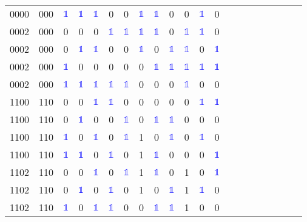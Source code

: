 \begin{longtable*}{c| cccccccccccccccccccc }
0000& 000& \textcolor{blue}{$\mathds{1}$}& \textcolor{blue}{$\mathds{1}$}& \textcolor{blue}{$\mathds{1}$}& 0& 0& \textcolor{blue}{$\mathds{1}$}& \textcolor{blue}{$\mathds{1}$}& 0& 0& \textcolor{blue}{$\mathds{1}$}& 0\\
0002& 000& 0& 0& 0& \textcolor{blue}{$\mathds{1}$}& \textcolor{blue}{$\mathds{1}$}& \textcolor{blue}{$\mathds{1}$}& \textcolor{blue}{$\mathds{1}$}& 0& \textcolor{blue}{$\mathds{1}$}& \textcolor{blue}{$\mathds{1}$}& 0\\
0002& 000& 0& \textcolor{blue}{$\mathds{1}$}& \textcolor{blue}{$\mathds{1}$}& 0& 0& \textcolor{blue}{$\mathds{1}$}& 0& \textcolor{blue}{$\mathds{1}$}& \textcolor{blue}{$\mathds{1}$}& 0& \textcolor{blue}{$\mathds{1}$}\\
0002& 000& \textcolor{blue}{$\mathds{1}$}& 0& 0& 0& 0& 0& \textcolor{blue}{$\mathds{1}$}& \textcolor{blue}{$\mathds{1}$}& \textcolor{blue}{$\mathds{1}$}& \textcolor{blue}{$\mathds{1}$}& \textcolor{blue}{$\mathds{1}$}\\
0002& 000& \textcolor{blue}{$\mathds{1}$}& \textcolor{blue}{$\mathds{1}$}& \textcolor{blue}{$\mathds{1}$}& \textcolor{blue}{$\mathds{1}$}& \textcolor{blue}{$\mathds{1}$}& 0& 0& 0& \textcolor{blue}{$\mathds{1}$}& 0& 0\\
1100& 110& 0& 0& \textcolor{blue}{$\mathds{1}$}& \textcolor{blue}{$\mathds{1}$}& 0& 0& 0& 0& 0& \textcolor{blue}{$\mathds{1}$}& \textcolor{blue}{$\mathds{1}$}\\
1100& 110& 0& \textcolor{blue}{$\mathds{1}$}& 0& 0& \textcolor{blue}{$\mathds{1}$}& 0& \textcolor{blue}{$\mathds{1}$}& \textcolor{blue}{$\mathds{1}$}& 0& 0& 0\\
1100& 110& \textcolor{blue}{$\mathds{1}$}& 0& \textcolor{blue}{$\mathds{1}$}& 0& \textcolor{blue}{$\mathds{1}$}& 1& 0& \textcolor{blue}{$\mathds{1}$}& 0& \textcolor{blue}{$\mathds{1}$}& 0\\
1100& 110& \textcolor{blue}{$\mathds{1}$}& \textcolor{blue}{$\mathds{1}$}& 0& \textcolor{blue}{$\mathds{1}$}& 0& 1& \textcolor{blue}{$\mathds{1}$}& 0& 0& 0& \textcolor{blue}{$\mathds{1}$}\\
1102& 110& 0& 0& \textcolor{blue}{$\mathds{1}$}& 0& \textcolor{blue}{$\mathds{1}$}& 1& \textcolor{blue}{$\mathds{1}$}& 0& 1& 0& \textcolor{blue}{$\mathds{1}$}\\
1102& 110& 0& \textcolor{blue}{$\mathds{1}$}& 0& \textcolor{blue}{$\mathds{1}$}& 0& 1& 0& \textcolor{blue}{$\mathds{1}$}& 1& \textcolor{blue}{$\mathds{1}$}& 0\\
1102& 110& \textcolor{blue}{$\mathds{1}$}& 0& \textcolor{blue}{$\mathds{1}$}& \textcolor{blue}{$\mathds{1}$}& 0& 0& \textcolor{blue}{$\mathds{1}$}& \textcolor{blue}{$\mathds{1}$}& 1& 0& 0\\

\end{longtable*}
